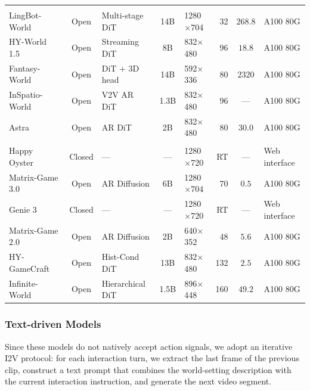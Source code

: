 \documentclass{llmxive}
\begin{document}
\begin{table}[!htbp]
\begin{tabular}{@{}lclclrcl@{}}
\addlinespace[4pt]
\multicolumn{8}{@{}l}{\textit{Camera-controlled models}} \\
\addlinespace[2pt]
LingBot-World~\cite{gao2026lingbot}          & Open   & Multi-stage DiT & 14B  & 1280$\times$704  & 32  & $268.8$ & A100 80G \\
HY-World 1.5~\cite{sun2025hyworldplay}       & Open   & Streaming DiT   & 8B   & 832$\times$480   & 96  & $18.8$  & A100 80G \\
Fantasy-World~\cite{fantasyworld2025}        & Open   & DiT + 3D head   & 14B  & 592$\times$336   & 80  & $2320$  & A100 80G \\
InSpatio-World~\cite{inspatio2026}           & Open   & V2V AR DiT      & 1.3B & 832$\times$480   & 96  & ---     & A100 80G \\
Astra~\cite{zhu2025astra}                    & Open   & AR DiT  & 2B   & 832$\times$480   & 80  & $30.0$  & A100 80G \\

\addlinespace[4pt]
\multicolumn{8}{@{}l}{\textit{Action-conditioned models}} \\
\addlinespace[2pt]
Happy Oyster~\cite{alibaba2026happyoyster}   & Closed & ---             & ---  & 1280$\times$720  & RT  & ---     & Web interface \\
Matrix-Game 3.0~\cite{he2026matrixgame3}     & Open   & AR Diffusion    & 6B   & 1280$\times$704  & 70  & $0.5$   & A100 80G \\
Genie 3~\cite{ball2025genie3}                & Closed & ---  & ---  & 1280$\times$720  & RT  & ---     & Web interface \\
Matrix-Game 2.0~\cite{he2025matrixgame2}     & Open   & AR Diffusion    & 2B   & 640$\times$352   & 48  & $5.6$   & A100 80G \\
HY-GameCraft~\cite{li2025hunyuangamecraft}   & Open   & Hist-Cond DiT   & 13B  & 832$\times$480   & 132 & $2.5$   & A100 80G \\
Infinite-World~\cite{wu2026infiniteworld}    & Open   & Hierarchical DiT & 1.5B & 896$\times$448   & 160 & $49.2$  & A100 80G \\

\bottomrule
\end{tabular}
\end{table}


\subsubsection{Text-driven Models}

Since these models do not natively accept action signals, we adopt an iterative I2V protocol: for each interaction turn, we extract the last frame of the previous clip, construct a text prompt that combines the world-setting description with the current interaction instruction, and generate the next video segment.
\end{document}
